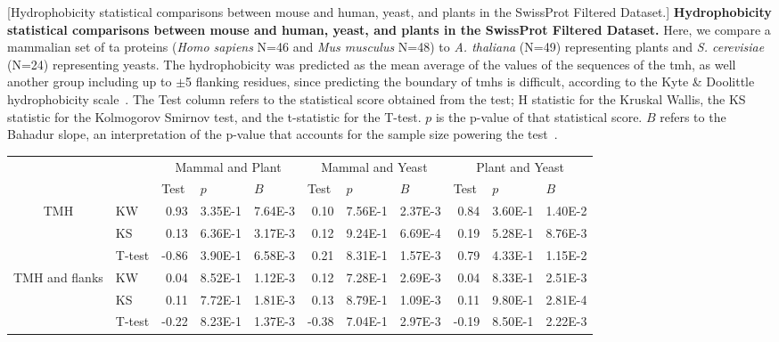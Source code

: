 \begin{table}[htbp]
\centering
{}[Hydrophobicity statistical comparisons between mouse and human, yeast, and plants in the SwissProt Filtered Dataset.]
{\textbf{Hydrophobicity statistical comparisons between mouse and human, yeast, and plants in the SwissProt Filtered Dataset.}
Here, we compare a mammalian set of \gls{ta} proteins (\textit{Homo sapiens} N=46 and \textit{Mus musculus} N=48) to \textit{A. thaliana} (N=49) representing plants  and  \textit{S. cerevisiae} (N=24) representing yeasts.
The hydrophobicity was predicted as the mean average of the values of the sequences of the \gls{tmh}, as well another group including up to $\pm$5 flanking residues, since predicting the boundary of \gls{tmh}s is difficult, according to the Kyte \& Doolittle hydrophobicity scale~\cite{Kyte1982}.
The Test column refers to the statistical score obtained from the test; H statistic for the Kruskal Wallis, the KS statistic for the Kolmogorov Smirnov test, and the t-statistic for the T-test.
$p$ is the p\--value of that statistical score.
$B$ refers to the Bahadur slope, an interpretation of the p\--value that accounts for the sample size powering the test~\cite{Bahadur1967, Bahadur1971}.}
\tiny

    \begin{tabular}{clrrrrrrrrr}
          &       & \multicolumn{3}{c}{Mammal and Plant} & \multicolumn{3}{c}{Mammal and Yeast} & \multicolumn{3}{c}{Plant and Yeast} \\
          &       & \multicolumn{1}{l}{Test} & \multicolumn{1}{l}{$p$} & \multicolumn{1}{l}{$B$} & \multicolumn{1}{l}{Test} & \multicolumn{1}{l}{$p$} & \multicolumn{1}{l}{$B$} & \multicolumn{1}{l}{Test} & \multicolumn{1}{l}{$p$} & \multicolumn{1}{l}{$B$} \\
    \multirow{3}[0]{*}{TMH } &  KW & 0.93  & 3.35E-1 & 7.64E-3 & 0.10  & 7.56E-1 & 2.37E-3 & 0.84  & 3.60E-1 & 1.40E-2 \\
          &  KS & 0.13  & 6.36E-1 & 3.17E-3 & 0.12  & 9.24E-1 & 6.69E-4 & 0.19  & 5.28E-1 & 8.76E-3 \\
          &  T-test & -0.86 & 3.90E-1 & 6.58E-3 & 0.21  & 8.31E-1 & 1.57E-3 & 0.79  & 4.33E-1 & 1.15E-2 \\
    \multirow{3}[0]{*}{TMH and flanks } &  KW & 0.04  & 8.52E-1 & 1.12E-3 & 0.12  & 7.28E-1 & 2.69E-3 & 0.04  & 8.33E-1 & 2.51E-3 \\
          &  KS & 0.11  & 7.72E-1 & 1.81E-3 & 0.13  & 8.79E-1 & 1.09E-3 & 0.11  & 9.80E-1 & 2.81E-4 \\
          &  T-test & -0.22 & 8.23E-1 & 1.37E-3 & -0.38 & 7.04E-1 & 2.97E-3 & -0.19 & 8.50E-1 & 2.22E-3 \\
    \end{tabular}%
                \label{table:speciestableswissprotstats}

\end{table}%

